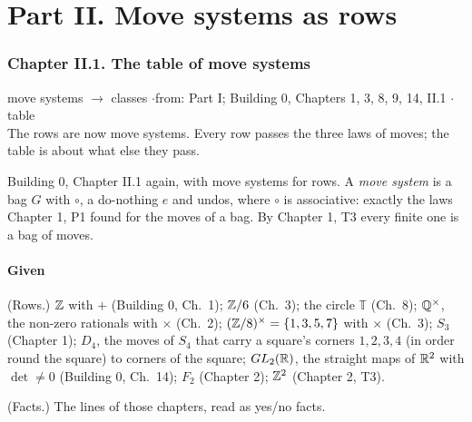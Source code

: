
\part*{Part II. Move systems as rows}

\section*{Chapter II.1. The table of move systems}
\begin{center}
{\normalsize move systems $\to$ classes \quad$\cdot$\quad from: Part I; Building 0, Chapters 1, 3, 8, 9, 14, II.1 \quad$\cdot$\quad table}\\[4pt]
{\small The rows are now move systems. Every row passes the three laws of moves; the table is about what else they pass.}
\end{center}

Building 0, Chapter II.1 again, with move systems for rows. A \emph{move system} is a bag $G$ with $\circ$, a do-nothing $e$ and undos, where $\circ$ is associative: exactly the laws Chapter 1, P1 found for the moves of a bag. By Chapter 1, T3 every finite one is a bag of moves.

\subsection*{Given}

\begin{lines}
\item[\lab{G1}] (Rows.) $\mathbb{Z}$ with $+$ (Building 0, Ch.\ 1); $\mathbb{Z}/6$ (Ch.\ 3); the circle $\mathbb{T}$ (Ch.\ 8); $\mathbb{Q}^\times$, the non-zero rationals with $\times$ (Ch.\ 2); $(\mathbb{Z}/8)^\times = \{1, 3, 5, 7\}$ with $\times$ (Ch.\ 3); $S_3$ (Chapter 1); $D_4$, the moves of $S_4$ that carry a square's corners $1, 2, 3, 4$ (in order round the square) to corners of the square; $GL_2(\mathbb{R})$, the straight maps of $\mathbb{R}^2$ with $\det \ne 0$ (Building 0, Ch.\ 14); $F_2$ (Chapter 2); $\mathbb{Z}^2$ (Chapter 2, T3).
\item[\lab{G2}] (Facts.) The lines of those chapters, read as yes/no facts.
\end{lines}

